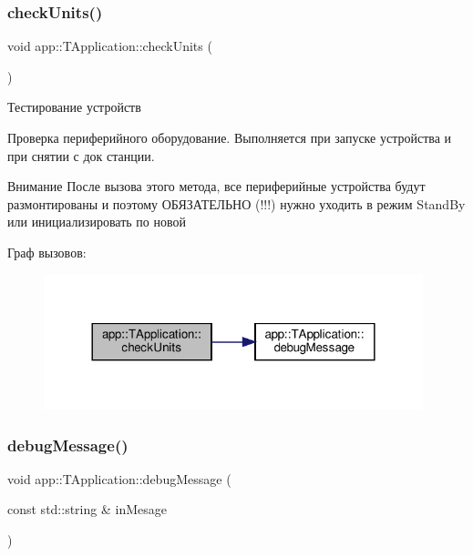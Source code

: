 \subsubsection{\texorpdfstring{check\+Units()}{checkUnits()}}
{\footnotesize\ttfamily void app\+::\+T\+Application\+::check\+Units (\begin{DoxyParamCaption}{ }\end{DoxyParamCaption})}



Тестирование устройств 

Проверка периферийного оборудование. Выполняется при запуске устройства и при снятии с док станции. \begin{DoxyAttention}{Внимание}
После вызова этого метода, все периферийные устройства будут размонтированы и поэтому ОБЯЗАТЕЛЬНО (!!!) нужно уходить в режим Stand\+By или инициализировать по новой 
\end{DoxyAttention}
Граф вызовов\+:\nopagebreak
\begin{figure}[H]
\begin{center}
\leavevmode
\includegraphics[width=312pt]{classapp_1_1_t_application_acf71a4fe338cbc1e771cc9a60431c3bf_cgraph}
\end{center}
\end{figure}
\mbox{\label{classapp_1_1_t_application_abec229b87538c5db318ef57f25f6e84d}} 
\subsubsection{\texorpdfstring{debug\+Message()}{debugMessage()}\hspace{0.1cm}{\footnotesize\ttfamily [1/4]}}
{\footnotesize\ttfamily void app\+::\+T\+Application\+::debug\+Message (\begin{DoxyParamCaption}\item[{const std\+::string \&}]{in\+Mesage }\end{DoxyParamCaption})}



